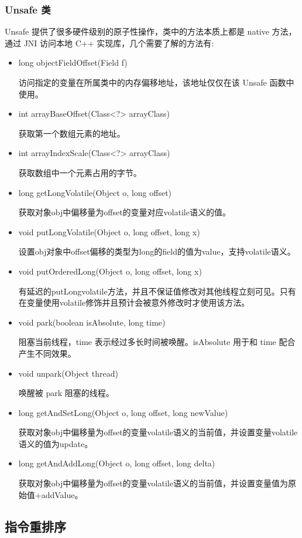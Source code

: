 \subsubsection*{Unsafe 类}

Unsafe 提供了很多硬件级别的原子性操作，类中的方法本质上都是 native 方法，通过 JNI 访问本地 C++ 实现库，几个需要了解的方法有:
\begin{itemize}
    \item long objectFieldOffset(Field f)
    
访问指定的变量在所属类中的内存偏移地址，该地址仅仅在该 Unsafe 函数中使用。
    \item int arrayBaseOffset(Class<?> arrayClass)
    
获取第一个数组元素的地址。
    \item int arrayIndexScale(Class<?> arrayClass)
    
获取数组中一个元素占用的字节。
    \item long getLongVolatile(Object o, long offset)
    
获取对象obj中偏移量为offset的变量对应volatile语义的值。
    \item void putLongVolatile(Object o, long offset, long x)
    
设置obj对象中offset偏移的类型为long的field的值为value，支持volatile语义。
    \item void putOrderedLong(Object o, long offset, long x)
    
有延迟的putLongvolatile方法，并且不保证值修改对其他线程立刻可见。只有在变量使用volatile修饰并且预计会被意外修改时才使用该方法。
    \item void park(boolean isAbsolute, long time)
    
阻塞当前线程，time 表示经过多长时间被唤醒。isAbsolute 用于和 time 配合产生不同效果。
    \item void unpark(Object thread)
    
唤醒被 park 阻塞的线程。
    \item long getAndSetLong(Object o, long offset, long newValue)
    
获取对象obj中偏移量为offset的变量volatile语义的当前值，并设置变量volatile语义的值为update。
    \item long getAndAddLong(Object o, long offset, long delta)
    
获取对象obj中偏移量为offset的变量volatile语义的当前值，并设置变量值为原始值+addValue。
\end{itemize}

\subsection{指令重排序}

